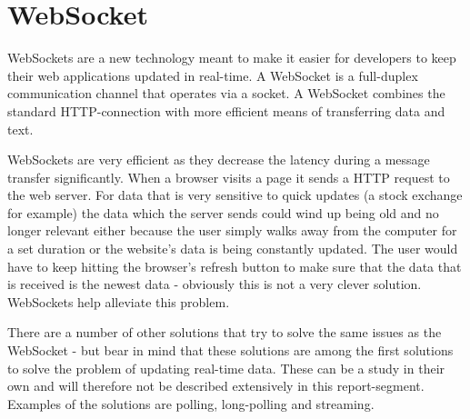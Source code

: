 \section{WebSocket}

WebSockets are a new technology meant to make it easier for developers to keep their web applications updated in real-time\cite{andersen10}. A WebSocket is a full-duplex communication channel 
that operates via a socket. A WebSocket combines the 
standard HTTP-connection with more efficient means of transferring data and 
text\cite{lubbersgreco}.


WebSockets are very efficient as they decrease the latency during a message 
transfer significantly. When a browser visits a page it 
sends a HTTP request to the web server. For data that is very sensitive to quick updates 
(a stock exchange for example) the data which the server sends could wind up 
being old and no longer relevant either because the user simply walks away 
from the computer for a set duration or the website's data is being constantly 
updated. The user would have to keep hitting the browser's 
refresh button to make sure that the data that is received is the newest data 
- obviously this is not a very clever solution. WebSockets 
help alleviate this problem\cite{lubbersgreco}.


There are a number of other solutions that try to solve the same issues as the 
WebSocket - but bear in mind that these solutions are
among the first solutions to solve the problem of updating real-time 
data\cite{lubbersgreco}. These can be a study in their own and 
will therefore not be described extensively in this report-segment. Examples 
of the solutions are polling, long-polling and streaming.






